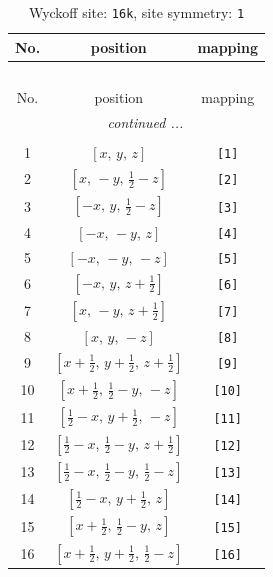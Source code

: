 \documentclass[fleqn,8pt]{jsarticle}
\begin{document}
\begin{longtable}{ccc}
\caption{Wyckoff site: {\tt 16k}, site symmetry: {\tt 1}}
 \\
 \hline \hline
No. & position & mapping \\ \hline \endfirsthead

\multicolumn{2}{l}{\tablename\ \thetable{}} \\
 \hline \hline
No. & position & mapping \\ \hline \endhead

 \hline \hline
\multicolumn{2}{r}{\footnotesize\it continued ...} \\ \endfoot

 \hline \hline
\multicolumn{2}{r}{} \\ \endlastfoot

1 & $\left[ x,\, y,\, z \right]$ & {\tt [1]} \\ \hline
2 & $\left[ x,\, - y,\, \frac{1}{2} - z \right]$ & {\tt [2]} \\ \hline
3 & $\left[ - x,\, y,\, \frac{1}{2} - z \right]$ & {\tt [3]} \\ \hline
4 & $\left[ - x,\, - y,\, z \right]$ & {\tt [4]} \\ \hline
5 & $\left[ - x,\, - y,\, - z \right]$ & {\tt [5]} \\ \hline
6 & $\left[ - x,\, y,\, z + \frac{1}{2} \right]$ & {\tt [6]} \\ \hline
7 & $\left[ x,\, - y,\, z + \frac{1}{2} \right]$ & {\tt [7]} \\ \hline
8 & $\left[ x,\, y,\, - z \right]$ & {\tt [8]} \\ \hline
9 & $\left[ x + \frac{1}{2},\, y + \frac{1}{2},\, z + \frac{1}{2} \right]$ & {\tt [9]} \\ \hline
10 & $\left[ x + \frac{1}{2},\, \frac{1}{2} - y,\, - z \right]$ & {\tt [10]} \\ \hline
11 & $\left[ \frac{1}{2} - x,\, y + \frac{1}{2},\, - z \right]$ & {\tt [11]} \\ \hline
12 & $\left[ \frac{1}{2} - x,\, \frac{1}{2} - y,\, z + \frac{1}{2} \right]$ & {\tt [12]} \\ \hline
13 & $\left[ \frac{1}{2} - x,\, \frac{1}{2} - y,\, \frac{1}{2} - z \right]$ & {\tt [13]} \\ \hline
14 & $\left[ \frac{1}{2} - x,\, y + \frac{1}{2},\, z \right]$ & {\tt [14]} \\ \hline
15 & $\left[ x + \frac{1}{2},\, \frac{1}{2} - y,\, z \right]$ & {\tt [15]} \\ \hline
16 & $\left[ x + \frac{1}{2},\, y + \frac{1}{2},\, \frac{1}{2} - z \right]$ & {\tt [16]} \\
\end{longtable}
\end{document}
